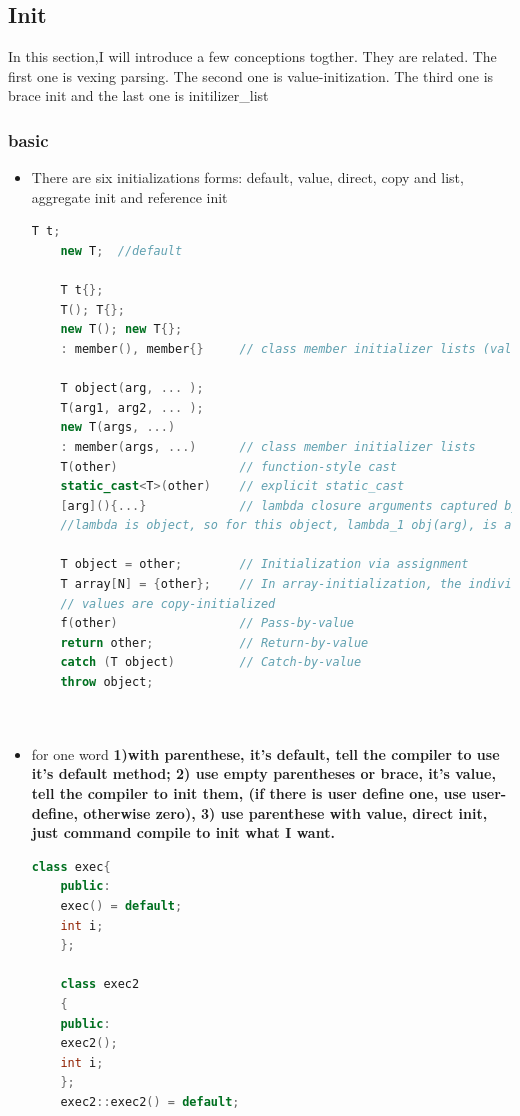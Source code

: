 \documentclass[a4paper,12pt,twoside]{book}
\begin{document}
\subsection{Init}
In this section,I will introduce a few conceptions togther. They are related. The first one is vexing parsing. The second one is value-initization. The third one is brace init and the last one is initilizer\_list
\subsubsection{basic}
\begin{itemize}
	\item There are six initializations forms: default, value, direct, copy and list, aggregate init and reference init
	\begin{lstlisting}[frame=single, language=c++]
	T t;
	new T;  //default
	
	T t{};
	T(); T{};
	new T(); new T{};
	: member(), member{}     // class member initializer lists (value Init)
	
	T object(arg, ... );
	T(arg1, arg2, ... );
	new T(args, ...)
	: member(args, ...)      // class member initializer lists
	T(other)                 // function-style cast
	static_cast<T>(other)    // explicit static_cast
	[arg](){...}             // lambda closure arguments captured by value
	//lambda is object, so for this object, lambda_1 obj(arg), is a direct init
	
	T object = other;        // Initialization via assignment
	T array[N] = {other};    // In array-initialization, the individual
	// values are copy-initialized
	f(other)                 // Pass-by-value
	return other;            // Return-by-value
	catch (T object)         // Catch-by-value
	throw object;
	
	
	\end{lstlisting}
	
	
	\item for one word \textbf{1)with parenthese, it's default, tell the compiler to use it's default method; 2) use empty parentheses or brace, it's value, tell the compiler to init them, (if there is user define one, use user-define, otherwise zero), 3) use parenthese with value, direct init, just command compile to init what I want.}
	\begin{lstlisting}[frame=single, language=c++]
	class exec{
	public:
	exec() = default;
	int i;
	};
	
	class exec2
	{
	public:
	exec2();
	int i;
	};
	exec2::exec2() = default;
	

\end{lstlisting}
\end{itemize}
\end{document}
